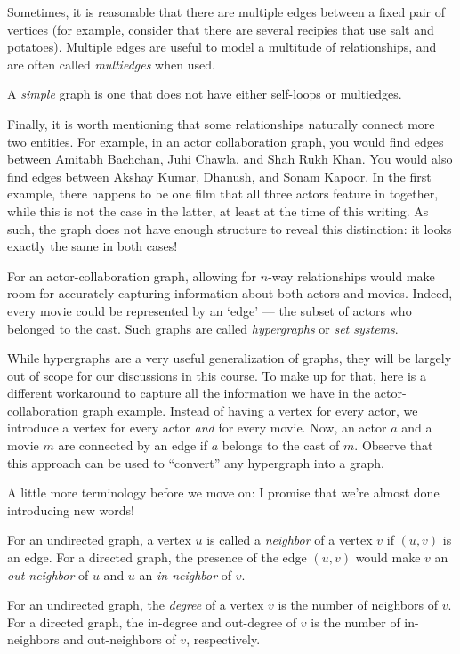 \documentclass[
  letterpaper,
  DIV=11,
  numbers=noendperiod]{scrreprt}
\begin{document}
Sometimes, it is reasonable that there are multiple edges between a
fixed pair of vertices (for example, consider that there are several
recipies that use salt and potatoes). Multiple edges are useful to model
a multitude of relationships, and are often called \emph{multiedges}
when used.

A \emph{simple} graph is one that does not have either self-loops or
multiedges.

Finally, it is worth mentioning that some relationships naturally
connect more two entities. For example, in an actor collaboration graph,
you would find edges between Amitabh Bachchan, Juhi Chawla, and Shah
Rukh Khan. You would also find edges between Akshay Kumar, Dhanush, and
Sonam Kapoor. In the first example, there happens to be one film that
all three actors feature in together, while this is not the case in the
latter, at least at the time of this writing. As such, the graph does
not have enough structure to reveal this distinction: it looks exactly
the same in both cases!

For an actor-collaboration graph, allowing for \(n\)-way relationships
would make room for accurately capturing information about both actors
and movies. Indeed, every movie could be represented by an `edge' ---
the subset of actors who belonged to the cast. Such graphs are called
\emph{hypergraphs} or \emph{set systems}.

While hypergraphs are a very useful generalization of graphs, they will
be largely out of scope for our discussions in this course. To make up
for that, here is a different workaround to capture all the information
we have in the actor-collaboration graph example. Instead of having a
vertex for every actor, we introduce a vertex for every actor \emph{and}
for every movie. Now, an actor \(a\) and a movie \(m\) are connected by
an edge if \(a\) belongs to the cast of \(m\). Observe that this
approach can be used to ``convert'' any hypergraph into a graph.

A little more terminology before we move on: I promise that we're almost
done introducing new words!

For an undirected graph, a vertex \(u\) is called a \emph{neighbor} of a
vertex \(v\) if \((u,v)\) is an edge. For a directed graph, the presence
of the edge \((u,v)\) would make \(v\) an \emph{out-neighbor} of \(u\)
and \(u\) an \emph{in-neighbor} of \(v\).

For an undirected graph, the \emph{degree} of a vertex \(v\) is the
number of neighbors of \(v\). For a directed graph, the in-degree and
out-degree of \(v\) is the number of in-neighbors and out-neighbors of
\(v\), respectively.
\end{document}

